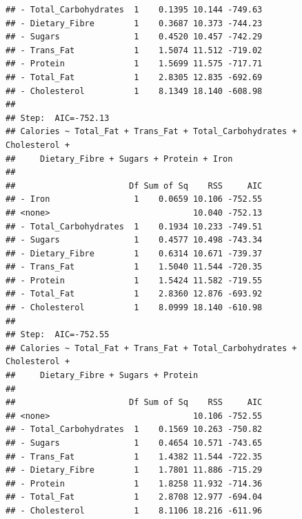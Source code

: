 \documentclass[
]{article}
\newenvironment{Shaded}{\begin{snugshade}}{\end{snugshade}}
\newcommand{\AttributeTok}[1]{\textcolor[rgb]{0.13,0.29,0.53}{#1}}
\newcommand{\FunctionTok}[1]{\textcolor[rgb]{0.13,0.29,0.53}{\textbf{#1}}}
\newcommand{\NormalTok}[1]{#1}
\newcommand{\SpecialCharTok}[1]{\textcolor[rgb]{0.81,0.36,0.00}{\textbf{#1}}}
\newcommand{\StringTok}[1]{\textcolor[rgb]{0.31,0.60,0.02}{#1}}
\begin{document}
\begin{verbatim}
## - Total_Carbohydrates  1    0.1395 10.144 -749.63
## - Dietary_Fibre        1    0.3687 10.373 -744.23
## - Sugars               1    0.4520 10.457 -742.29
## - Trans_Fat            1    1.5074 11.512 -719.02
## - Protein              1    1.5699 11.575 -717.71
## - Total_Fat            1    2.8305 12.835 -692.69
## - Cholesterol          1    8.1349 18.140 -608.98
## 
## Step:  AIC=-752.13
## Calories ~ Total_Fat + Trans_Fat + Total_Carbohydrates + Cholesterol + 
##     Dietary_Fibre + Sugars + Protein + Iron
## 
##                       Df Sum of Sq    RSS     AIC
## - Iron                 1    0.0659 10.106 -752.55
## <none>                             10.040 -752.13
## - Total_Carbohydrates  1    0.1934 10.233 -749.51
## - Sugars               1    0.4577 10.498 -743.34
## - Dietary_Fibre        1    0.6314 10.671 -739.37
## - Trans_Fat            1    1.5040 11.544 -720.35
## - Protein              1    1.5424 11.582 -719.55
## - Total_Fat            1    2.8360 12.876 -693.92
## - Cholesterol          1    8.0999 18.140 -610.98
## 
## Step:  AIC=-752.55
## Calories ~ Total_Fat + Trans_Fat + Total_Carbohydrates + Cholesterol + 
##     Dietary_Fibre + Sugars + Protein
## 
##                       Df Sum of Sq    RSS     AIC
## <none>                             10.106 -752.55
## - Total_Carbohydrates  1    0.1569 10.263 -750.82
## - Sugars               1    0.4654 10.571 -743.65
## - Trans_Fat            1    1.4382 11.544 -722.35
## - Dietary_Fibre        1    1.7801 11.886 -715.29
## - Protein              1    1.8258 11.932 -714.36
## - Total_Fat            1    2.8708 12.977 -694.04
## - Cholesterol          1    8.1106 18.216 -611.96
\end{verbatim}

\begin{Shaded}
\end{Shaded}
\end{document}

